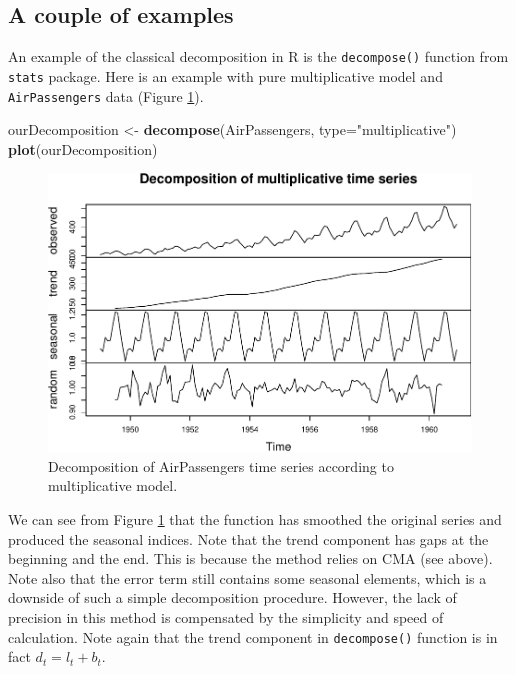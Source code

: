 \documentclass[]{book}
\newenvironment{Shaded}{\begin{snugshade}}{\end{snugshade}}
\newcommand{\DataTypeTok}[1]{\textcolor[rgb]{0.13,0.29,0.53}{#1}}
\newcommand{\KeywordTok}[1]{\textcolor[rgb]{0.13,0.29,0.53}{\textbf{#1}}}
\newcommand{\NormalTok}[1]{#1}
\newcommand{\StringTok}[1]{\textcolor[rgb]{0.31,0.60,0.02}{#1}}
\theoremstyle{definition}
\theoremstyle{definition}
\theoremstyle{definition}
\theoremstyle{definition}
\theoremstyle{remark}
\begin{document}
\hypertarget{a-couple-of-examples}{%
\subsection{A couple of examples}\label{a-couple-of-examples}}

An example of the classical decomposition in R is the \texttt{decompose()} function from \texttt{stats} package. Here is an example with pure multiplicative model and \texttt{AirPassengers} data (Figure \ref{fig:decomposeAirPassengers}).

\begin{Shaded}
\begin{Highlighting}[]
\NormalTok{ourDecomposition <-}\StringTok{ }\KeywordTok{decompose}\NormalTok{(AirPassengers,}
                              \DataTypeTok{type=}\StringTok{"multiplicative"}\NormalTok{)}
\KeywordTok{plot}\NormalTok{(ourDecomposition)}
\end{Highlighting}
\end{Shaded}

\begin{figure}
\centering
\includegraphics{Svetunkov--2022----ADAM_files/figure-latex/decomposeAirPassengers-1.pdf}
\caption{\label{fig:decomposeAirPassengers}Decomposition of AirPassengers time series according to multiplicative model.}
\end{figure}

We can see from Figure \ref{fig:decomposeAirPassengers} that the function has smoothed the original series and produced the seasonal indices. Note that the trend component has gaps at the beginning and the end. This is because the method relies on CMA (see above). Note also that the error term still contains some seasonal elements, which is a downside of such a simple decomposition procedure. However, the lack of precision in this method is compensated by the simplicity and speed of calculation. Note again that the trend component in \texttt{decompose()} function is in fact \(d_t = l_{t}+b_{t}\).
\end{document}
